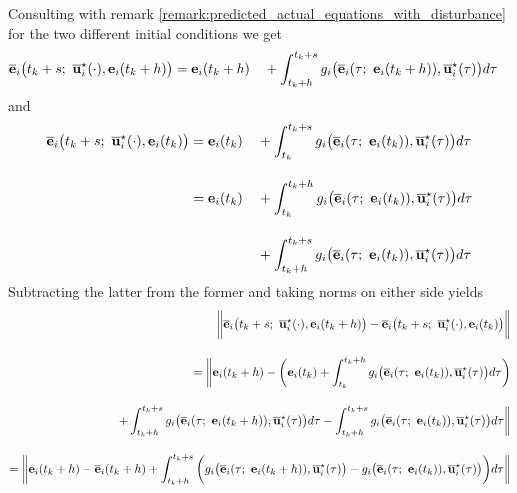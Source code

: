 \begin{gg_box}
Consulting with remark \eqref{remark:predicted_actual_equations_with_disturbance}
for the two different initial conditions we get
\begin{alignat}{2}
  \overline{\vect{e}}_i\big(t_k + s;\ \overline{\vect{u}}_i^{\star}(\cdot), \vect{e}_i(t_k +h)\big)
    &= \vect{e}_i(t_k +h)
    &&+ \int_{t_k +h}^{t_k + s} g_i\big(\overline{\vect{e}}_i(\tau;\ \vect{e}_i(t_k + h)), \overline{\vect{u}}_i^{\star}(\tau)\big) d\tau
\end{alignat}
and
\begin{alignat}{2}
  \overline{\vect{e}}_i\big(t_k + s;\ \overline{\vect{u}}_i^{\star}(\cdot), \vect{e}_i(t_k)\big)
    &= \vect{e}_i(t_k)
    &&+ \int_{t_k}^{t_k + s} g_i\big(\overline{\vect{e}}_i(\tau;\ \vect{e}_i(t_k)), \overline{\vect{u}}_i^{\star}(\tau)\big) d\tau \\[2.5ex]
  &= \vect{e}_i(t_k)
    &&+ \int_{t_k}^{t_k + h} g_i\big(\overline{\vect{e}}_i(\tau;\ \vect{e}_i(t_k)), \overline{\vect{u}}_i^{\star}(\tau)\big) d\tau \\[2.5ex]
  & &&+ \int_{t_k + h}^{t_k + s} g_i\big(\overline{\vect{e}}_i(\tau;\ \vect{e}_i(t_k)), \overline{\vect{u}}_i^{\star}(\tau)\big) d\tau
\end{alignat}
Subtracting the latter from the former and taking norms on either side yields
\begin{align}
  \bigg \| \overline{\vect{e}}_i\big(t_k + s;\ \overline{\vect{u}}_i^{\star}(\cdot), \vect{e}_i(t_k +h)\big)
    -\overline{\vect{e}}_i\big(t_k + s;\ \overline{\vect{u}}_i^{\star}(\cdot), \vect{e}_i(t_k)\big) \bigg \| \\[2.5ex]
 = \bigg\| \vect{e}_i(t_k +h)
 - \bigg( \vect{e}_i(t_k) + \int_{t_k}^{t_k + h} g_i\big(\overline{\vect{e}}_i(\tau;\ \vect{e}_i(t_k)), \overline{\vect{u}}_i^{\star}(\tau)\big) d\tau \bigg) \\[2.5ex]
    + \int_{t_k +h}^{t_k + s} g_i\big(\overline{\vect{e}}_i(\tau;\ \vect{e}_i(t_k + h)), \overline{\vect{u}}_i^{\star}(\tau)\big) d\tau
    - \int_{t_k + h}^{t_k + s} g_i\big(\overline{\vect{e}}_i(\tau;\ \vect{e}_i(t_k)), \overline{\vect{u}}_i^{\star}(\tau)\big) d\tau \bigg\| \\[2.5ex]
    = \bigg\| \vect{e}_i(t_k +h) - \overline{\vect{e}}_i(t_k + h)
    + \int_{t_k +h}^{t_k + s} \bigg( g_i\big(\overline{\vect{e}}_i(\tau;\ \vect{e}_i(t_k + h)), \overline{\vect{u}}_i^{\star}(\tau)\big)
    -  g_i\big(\overline{\vect{e}}_i(\tau;\ \vect{e}_i(t_k)), \overline{\vect{u}}_i^{\star}(\tau)\big) \bigg) d\tau \bigg\| \\[2.5ex]

\end{align}
\end{gg_box}
